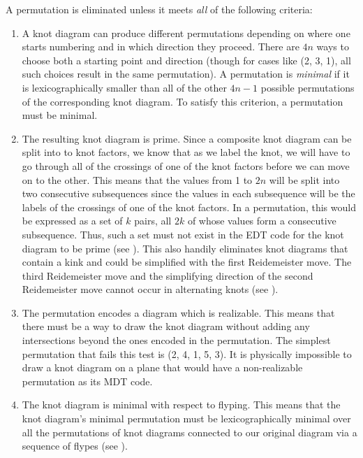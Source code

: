 \begin{paper}
A permutation is eliminated unless it meets \textit{all} of the following
criteria:

\begin{enumerate}
\item A knot diagram can produce different permutations depending on where one
starts numbering and in which direction they proceed.
There are $4n$ ways to choose both a starting point and direction (though for
cases like (2, 3, 1), all such choices result in the same permutation).
A permutation is \textit{minimal} if it is lexicographically smaller than all of
the other $4n-1$ possible permutations of the corresponding knot diagram.
To satisfy this criterion, a permutation must be minimal.

\item The resulting knot diagram is prime.
Since a composite knot diagram can be split into to knot factors, we know that
as we label the knot, we will have to go through all of the crossings of one of
the knot factors before we can move on to the other.
This means that the values from 1 to $2n$ will be split into two consecutive
subsequences since the values in each subsequence will be the labels of the
crossings of one of the knot factors.
In a permutation, this would be expressed as a set of $k$ pairs, all $2k$ of
whose values form a consecutive subsequence.
Thus, such a set must not exist in the EDT code for the knot diagram to be prime
(see \figComposite).
This also handily eliminates knot diagrams that contain a kink and could be
simplified with the first Reidemeister move.
The third Reidemeister move and the simplifying direction of the second
Reidemeister move cannot occur in alternating knots (see \figMoves).

\item The permutation encodes a diagram which is realizable.
This means that there must be a way to draw the knot diagram without adding any
intersections beyond the ones encoded in the permutation.
The simplest permutation that fails this test is (2, 4, 1, 5, 3).
It is physically impossible to draw a knot diagram on a plane that would have a
non-realizable permutation as its MDT code.

\item The knot diagram is minimal with respect to flyping.
This means that the knot diagram's minimal permutation must be lexicographically
minimal over all the permutations of knot diagrams connected to our original
diagram via a sequence of flypes (see \figMoves).
\end{enumerate}


\end{paper}
